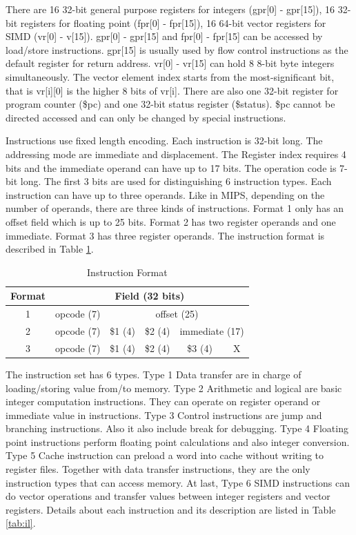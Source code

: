 \documentclass{sig-alternate}
\begin{document}
There are 16 32-bit general purpose registers for integers (gpr[0] - gpr[15]), 16 32-bit registers for floating point (fpr[0] - fpr[15]), 16 64-bit vector registers for SIMD (vr[0] - v[15]). gpr[0] - gpr[15] and fpr[0] - fpr[15] can be accessed by load/store instructions. gpr[15] is usually used by flow control instructions as the default register for return address. vr[0] - vr[15] can hold 8 8-bit byte integers simultaneously. The vector element index starts from the most-significant bit, that is vr[i][0] is the higher 8 bits of vr[i]. There are also one 32-bit register for program counter (\$pc) and one 32-bit status register (\$status). \$pc cannot be directed accessed and can only be changed by special instructions.

Instructions use fixed length encoding. Each instruction is 32-bit long. The addressing mode are immediate and displacement. The Register index requires 4 bits and the immediate operand can have up to 17 bits. The operation code is 7-bit long. The first 3 bits are used for distinguishing 6 instruction types. Each instruction can have up to three operands. Like in MIPS, depending on the number of operands, there are three kinds of instructions. Format 1 only has an offset field which is up to 25 bits. Format 2 has two register operands and one immediate. Format 3 has three register operands. The instruction format is described in Table \ref{tab:if}. 

\begin{table}
\caption{Instruction Format}
\label{tab:if}
\begin{tabular}{|c|c|c|c|c|c|}
\hline
 Format & \multicolumn{5}{c|}{Field (32 bits)}\\
 \hline
1 & opcode (7) & \multicolumn{4}{c|}{offset (25)}\\
\hline
2 & opcode (7) & \$1 (4) & \$2 (4) & \multicolumn{2}{c|}{immediate (17)}\\
\hline
3 & opcode (7) & \$1 (4) & \$2 (4) & \$3 (4) & X\\
\hline
\end{tabular}
\end{table}

The instruction set has 6 types. Type 1 Data transfer are in charge of loading/storing value from/to memory. Type 2 Arithmetic and logical are basic integer computation instructions. They can operate on register operand or immediate value in instructions. Type 3 Control instructions are jump and branching instructions. Also it also include break for debugging. Type 4 Floating point instructions perform floating point calculations and also integer conversion. Type 5 Cache instruction can preload a word into cache without writing to register files. Together with data transfer instructions, they are the only instruction types that can access memory. At last, Type 6 SIMD instructions can do vector operations and transfer values between integer registers and vector registers. Details about each instruction and its description are listed in Table \ref{tab:il}.
\end{document}
